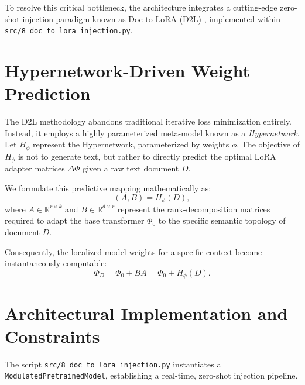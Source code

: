\documentclass[12pt,a4paper]{report}
\newcommand{\R}{\mathbb{R}}
\begin{document}
To resolve this critical bottleneck, the architecture integrates a cutting-edge zero-shot injection paradigm known as Doc-to-LoRA (D2L) \cite{sakana2024doctolora}, implemented within \texttt{src/8\_doc\_to\_lora\_injection.py}.

\section{Hypernetwork-Driven Weight Prediction}

The D2L methodology abandons traditional iterative loss minimization entirely. Instead, it employs a highly parameterized meta-model known as a \textit{Hypernetwork}. Let $H_\phi$ represent the Hypernetwork, parameterized by weights $\phi$. The objective of $H_\phi$ is not to generate text, but rather to directly predict the optimal LoRA adapter matrices $\Delta\Phi$ given a raw text document $D$.

We formulate this predictive mapping mathematically as:
\begin{equation}
    (A, B) = H_\phi(D),
\end{equation}
where $A \in \R^{r \times k}$ and $B \in \R^{d \times r}$ represent the rank-decomposition matrices required to adapt the base transformer $\Phi_0$ to the specific semantic topology of document $D$.

Consequently, the localized model weights for a specific context become instantaneously computable:
\begin{equation}
    \Phi_{D} = \Phi_0 + B A = \Phi_0 + H_\phi(D).
\end{equation}

\section{Architectural Implementation and Constraints}

The script \texttt{src/8\_doc\_to\_lora\_injection.py} instantiates a \texttt{ModulatedPretrainedModel}, establishing a real-time, zero-shot injection pipeline. 
\end{document}
